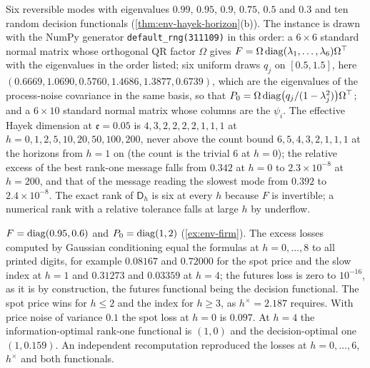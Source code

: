 \begin{numcheck}\label{chk:env-hayek}
Six reversible modes with eigenvalues $0.99$, $0.95$, $0.9$, $0.75$, $0.5$ and $0.3$ and ten random decision functionals (\cref{thm:env-hayek-horizon}(b)). The instance is drawn with the NumPy generator \texttt{default\_rng(311109)} in this order: a $6\times6$ standard normal matrix whose orthogonal QR factor $\Omega$ gives $F=\Omega\operatorname{diag}(\lambda_1,\dots,\lambda_6)\Omega^\top$ with the eigenvalues in the order listed; six uniform draws $q_j$ on $[0.5,1.5]$, here $(0.6669,1.0690,0.5760,1.4686,1.3877,0.6739)$, which are the eigenvalues of the process-noise covariance in the same basis, so that $P_0=\Omega\operatorname{diag}\bigl(q_j/(1-\lambda_j^2)\bigr)\Omega^\top$; and a $6\times10$ standard normal matrix whose columns are the $\psi_i$. The effective Hayek dimension at $\mathfrak e=0.05$ is $4,3,2,2,2,2,1,1,1$ at $h=0,1,2,5,10,20,50,100,200$, never above the count bound $6,5,4,3,2,1,1,1$ at the horizons from $h=1$ on (the count is the trivial 6 at $h=0$); the relative excess of the best rank-one message falls from $0.342$ at $h=0$ to $2.3\times10^{-8}$ at $h=200$, and that of the message reading the slowest mode from $0.392$ to $2.4\times10^{-8}$. The exact rank of $\mathsf D_h$ is six at every $h$ because $F$ is invertible; a numerical rank with a relative tolerance falls at large $h$ by underflow.
\end{numcheck}

\begin{numcheck}\label{chk:env-firm}
$F=\operatorname{diag}(0.95,0.6)$ and $P_0=\operatorname{diag}(1,2)$ (\cref{ex:env-firm}). The excess losses computed by Gaussian conditioning equal the formulas at $h=0,\dots,8$ to all printed digits, for example $0.08167$ and $0.72000$ for the spot price and the slow index at $h=1$ and $0.31273$ and $0.03359$ at $h=4$; the futures loss is zero to $10^{-16}$, as it is by construction, the futures functional being the decision functional. The spot price wins for $h\le2$ and the index for $h\ge3$, as $h^\times=2.187$ requires. With price noise of variance $0.1$ the spot loss at $h=0$ is $0.097$. At $h=4$ the information-optimal rank-one functional is $(1,0)$ and the decision-optimal one $(1,0.159)$. An independent recomputation reproduced the losses at $h=0,\dots,6$, $h^\times$ and both functionals.
\end{numcheck}

